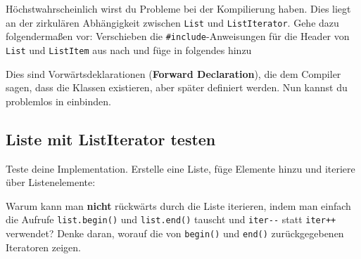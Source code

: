 
Höchstwahrscheinlich wirst du Probleme bei der Kompilierung haben.
Dies liegt an der zirkulären Abhängigkeit zwischen \lstinline{List} und \lstinline{ListIterator}.
Gehe dazu folgendermaßen vor:
Verschieben die \lstinline{#include}-Anweisungen für die Header von \lstinline{List} und \lstinline{ListItem} aus  nach  und füge in  folgendes hinzu


Dies sind Vorwärtsdeklarationen (\textbf{Forward Declaration}), die dem Compiler sagen, dass die Klassen existieren, aber später definiert werden. Nun kannst du problemlos  in  einbinden.

\subsection{Liste mit ListIterator testen}
Teste deine Implementation.
Erstelle eine Liste, füge Elemente hinzu und iteriere über Listenelemente:


Warum kann man \textbf{nicht} rückwärts durch die Liste iterieren, indem man einfach die Aufrufe \lstinline{list.begin()} und \lstinline{list.end()} tauscht und \lstinline{iter--} statt \lstinline{iter++} verwendet?
Denke daran, worauf die von \lstinline{begin()} und \lstinline{end()} zurückgegebenen Iteratoren zeigen.

